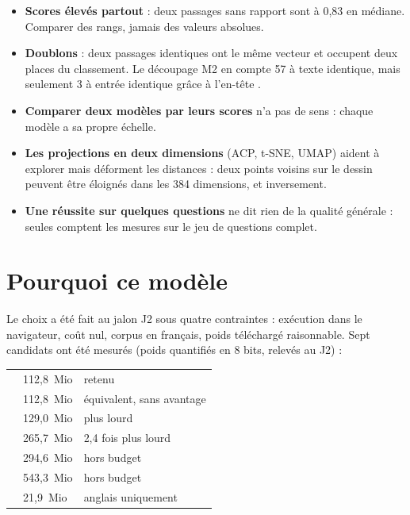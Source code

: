\begin{itemize}
\item \textbf{Scores élevés partout} : deux passages sans rapport sont à 0,83 en médiane. Comparer des rangs, jamais
  des valeurs absolues.
\item \textbf{Doublons} : deux passages identiques ont le même vecteur et occupent deux places du classement. Le
  découpage M2 en compte 57 à texte identique, mais seulement 3 à entrée identique grâce à l'en-tête \mesure.
\item \textbf{Comparer deux modèles par leurs scores} n'a pas de sens : chaque modèle a sa propre échelle.
\item \textbf{Les projections en deux dimensions} (ACP, t-SNE, UMAP) aident à explorer mais déforment les distances :
  deux points voisins sur le dessin peuvent être éloignés dans les 384 dimensions, et inversement.
\item \textbf{Une réussite sur quelques questions} ne dit rien de la qualité générale : seules comptent les mesures
  sur le jeu de questions complet.
\end{itemize}

\section{Pourquoi ce modèle}

Le choix a été fait au jalon J2 sous quatre contraintes : exécution dans le navigateur, coût nul, corpus en français,
poids téléchargé raisonnable. Sept candidats ont été mesurés (poids quantifiés en 8 bits, relevés au J2) :

\begin{tabletype}
\begin{tabularx}{\textwidth}{@{}L{9.0cm}R{2.0cm}Y@{}}
\toprule
{} &  &  \\
\midrule
{} & 112,8~Mio & retenu \\
 & 112,8~Mio & équivalent, sans avantage \\
 & 129,0~Mio & plus lourd \\
 & 265,7~Mio & 2,4 fois plus lourd \\
 & 294,6~Mio & hors budget \\
 & 543,3~Mio & hors budget \\
 & 21,9~Mio & anglais uniquement \\
\bottomrule
\end{tabularx}
\end{tabletype}

